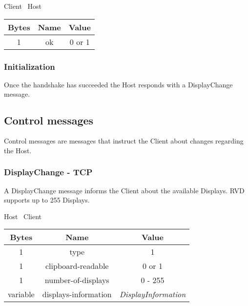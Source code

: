 \begin{center}
    Client \textrightarrow\ Host\\
    \begin{tabular}{|c|c|c|}
        \hline
        \textbf{Bytes} & \textbf{Name} & \textbf{Value} \\
        \hline
        1              & ok            & 0 or 1         \\
        \hline
    \end{tabular}
\end{center}

\subsubsection{Initialization}

Once the handshake has succeeded the Host responds with a DisplayChange message.

\subsection{Control messages}
Control messages are messages that instruct the Client about changes regarding the Host.

\subsubsection{DisplayChange - TCP}
A DisplayChange message informs the Client about the available Displays. RVD supports up to 255
Displays.

\begin{center}
    Host \textrightarrow\ Client\\
    \begin{tabular}{|c|c|c|}
        \hline
        \textbf{Bytes} & \textbf{Name}        & \textbf{Value}            \\
        \hline
        1              & type                 & 1                         \\
        \hline
        1              & clipboard-readable   & 0 or 1                    \\
        \hline
        1              & number-of-displays   & 0 - 255                   \\
        \hline
        variable       & displays-information & \emph{DisplayInformation} \\
        \hline
    \end{tabular}
\end{center}

